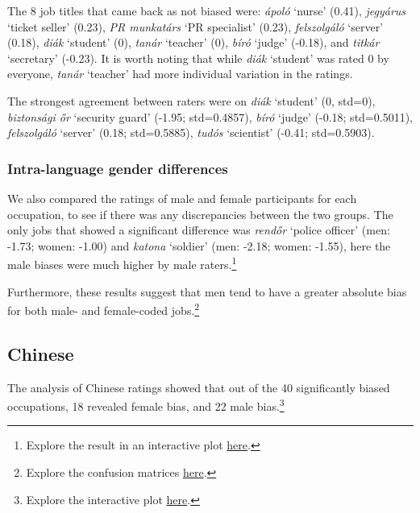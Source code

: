\documentclass[10pt, a4paper]{article}
\begin{document}
The 8 job titles that came back as not biased were: \textit{ápoló} `nurse' (0.41), \textit{jegyárus} `ticket seller' (0.23), \textit{PR munkatárs} `PR specialist' (0.23), \textit{felszolgáló} `server' (0.18),  \textit{diák} `student' (0), \textit{tanár} `teacher' (0), \textit{bíró} `judge' (-0.18), and \textit{titkár} `secretary' (-0.23). It is worth noting that while \textit{diák} `student' was rated 0 by everyone, \textit{tanár} `teacher' had more individual variation in the ratings.

The strongest agreement between raters were on \textit{diák} `student' (0, std=0), \textit{biztonsági őr} `security guard' (-1.95; std=0.4857), \textit{bíró} `judge' (-0.18; std=0.5011), \textit{felszolgáló} `server' (0.18; std=0.5885), \textit{tudós} `scientist' (-0.41; std=0.5903).

\subsubsection{Intra-language gender differences}

We also compared the ratings of male and female participants for each occupation, to see if there was any discrepancies between the two groups. The only jobs that showed a significant difference was \textit{rendőr} `police officer' (men: -1.73; women: -1.00) and \textit{katona} `soldier' (men: -2.18; women: -1.55), here the male biases were much higher by male raters.\footnote{Explore the result in an interactive plot \href{https://anonymous.4open.science/api/repo/occupational-gender-bias/file/occupations_hu_gender.html?v=56f1a2e8}{here}.}

Furthermore, these results suggest that men tend to have a greater absolute bias for both male- and female-coded jobs.\footnote{Explore the confusion matrices \href{https://anonymous.4open.science/api/repo/occupational-gender-bias/file/confusion_matrices.html?v=1d305345}{here}.}



\subsection{Chinese}

The analysis of Chinese ratings showed that out of the 40 significantly biased occupations, 18 revealed female bias, and 22 male bias.\footnote{Explore the interactive plot \href{https://anonymous.4open.science/api/repo/occupational-gender-bias/file/occupations_zh.html?v=ea85a011}{here}.}
\end{document}

